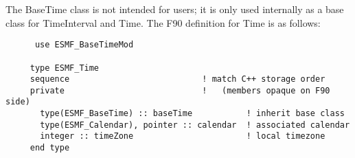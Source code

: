 
The BaseTime class is not intended for users; it is only used internally as a
base class for TimeInterval and Time.  The F90 definition for
Time is as follows:

\begin{verbatim}
      use ESMF_BaseTimeMod

     type ESMF_Time
     sequence                           ! match C++ storage order
     private                            !   (members opaque on F90 side)
       type(ESMF_BaseTime) :: baseTime           ! inherit base class
       type(ESMF_Calendar), pointer :: calendar  ! associated calendar
       integer :: timeZone                       ! local timezone
     end type
\end{verbatim}

